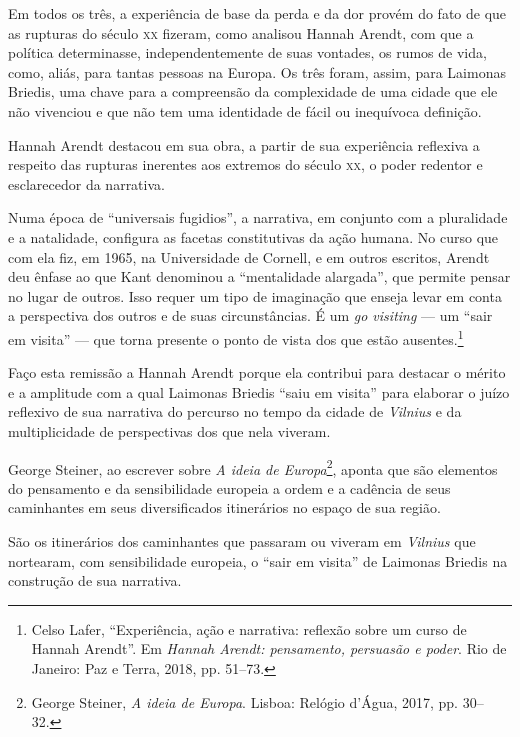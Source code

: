 Em todos os três, a experiência de base da perda e da dor provém do fato
de que as rupturas do século \textsc{xx} fizeram, como analisou Hannah Arendt,
com que a política determinasse, independentemente de suas vontades, os
rumos de vida, como, aliás, para tantas pessoas na Europa. Os três foram, assim, 
para Laimonas Briedis, uma chave para a
compreensão da complexidade de uma cidade que ele não vivenciou e que
não tem uma identidade de fácil ou inequívoca definição.

Hannah Arendt destacou em sua obra, a partir de sua experiência
reflexiva a respeito das rupturas inerentes aos extremos do século \textsc{xx}, o
poder redentor e esclarecedor da narrativa.

Numa época de ``universais fugidios'', a narrativa, em conjunto com a
pluralidade e a natalidade, configura as facetas constitutivas da ação
humana. No curso que com ela fiz, em 1965, na Universidade de Cornell, e
em outros escritos, Arendt deu ênfase ao que Kant denominou a
``mentalidade alargada'', que permite pensar no lugar de outros. Isso
requer um tipo de imaginação que enseja levar em conta a perspectiva dos
outros e de suas circunstâncias. É um \textit{go visiting} --- um ``sair em
visita'' --- que torna presente o ponto de vista dos que estão
ausentes.\footnote{Celso Lafer, ``Experiência, ação e narrativa:
  reflexão sobre um curso de Hannah Arendt''. Em \textit{Hannah Arendt:
  pensamento, persuasão e poder}. Rio de Janeiro:
  Paz e Terra, 2018, pp. 51--73.}

Faço esta remissão a Hannah Arendt porque ela contribui para destacar o
mérito e a amplitude com a qual Laimonas Briedis ``saiu em visita'' para
elaborar o juízo reflexivo de sua narrativa do percurso no tempo da
cidade de \textit{Vilnius} e da multiplicidade de perspectivas dos que nela
viveram.

George Steiner, ao escrever sobre \textit{A ideia de Europa}\footnote{George Steiner, 
\textit{A ideia de Europa}. Lisboa: Relógio d'Água, 
2017, pp. 30--32.}, aponta que
são elementos do pensamento e da sensibilidade europeia a ordem e a
cadência de seus caminhantes em seus diversificados itinerários no
espaço de sua região.

São os itinerários dos caminhantes que passaram ou viveram em \textit{Vilnius}
que nortearam, com sensibilidade europeia, o ``sair em visita'' de
Laimonas Briedis na construção de sua narrativa.

